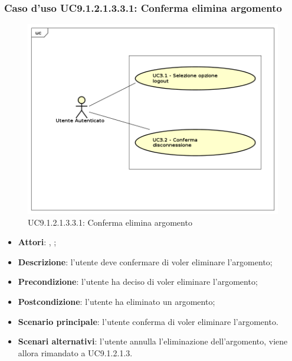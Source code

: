 							\subsubsection{Caso d'uso UC9.1.2.1.3.3.1: Conferma elimina argomento}
							\label{UC9.1.2.1.3.3.1}
							\begin{figure}[h]
								\centering
								\includegraphics[scale=0.7,keepaspectratio]{UML/UC9.png}
								\caption{UC9.1.2.1.3.3.1: Conferma elimina argomento}
							\end{figure}
							\FloatBarrier
							\begin{itemize}
								\item \textbf{Attori}: \uau, \uaupro;
								\item \textbf{Descrizione}: l'utente deve confermare di voler eliminare l'argomento;
								\item \textbf{Precondizione}: l'utente ha deciso di voler eliminare l'argomento;
								\item \textbf{Postcondizione}: l'utente ha eliminato un argomento;
								\item \textbf{Scenario principale}: l'utente conferma di voler eliminare l'argomento. 
								\item \textbf{Scenari alternativi}: l'utente annulla l'eliminazione dell'argomento, viene allora rimandato a UC9.1.2.1.3.
							\end{itemize}						
						

